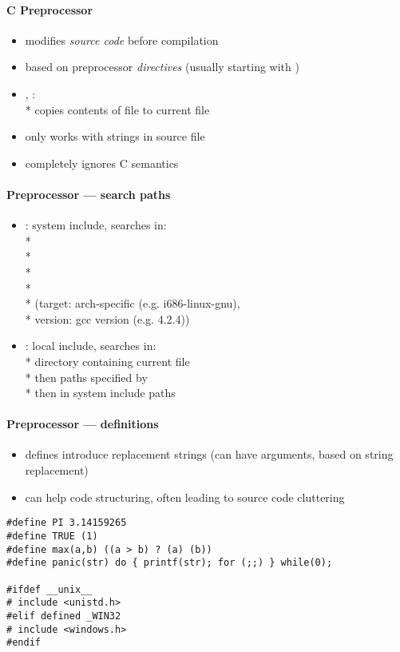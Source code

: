 \paragraph{C Preprocessor}
\begin{itemize}
  \item modifies \emph{source code} before compilation
  \item based on preprocessor \emph{directives} (usually starting with \code{#})
  \item {}, : \\*
    copies contents of file to current file
  \item only works with strings in source file
  \item completely ignores C semantics
\end{itemize}

\paragraph{Preprocessor --- search paths}
\begin{itemize}
  \item {}: system include, searches in: \\*
     \\*
     \\*
     \\*
     \\*
    (target: arch-specific (e.g. i686-linux-gnu), \\*
    \phantom{x} version: gcc version (e.g. 4.2.4))
  \item {}: local include, searches in: \\*
    directory containing current file \\*
    then paths specified by  \\*
    then in system include paths
\end{itemize}

\paragraph{Preprocessor --- definitions}
\begin{itemize}
  \item defines introduce replacement strings (can have arguments, based on string replacement)
  \item can help code structuring, often leading to source code cluttering
\end{itemize}
\begin{lstlisting}[style=customc]
#define PI 3.14159265
#define TRUE (1)
#define max(a,b) ((a > b) ? (a) (b))
#define panic(str) do { printf(str); for (;;) } while(0);

#ifdef __unix__
# include <unistd.h>
#elif defined _WIN32
# include <windows.h>
#endif
\end{lstlisting}

